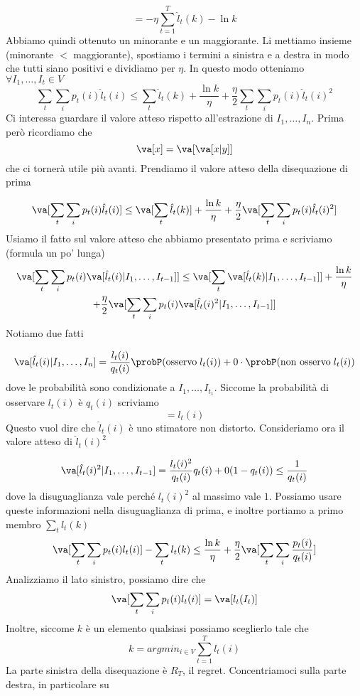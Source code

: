 \documentclass[12pt]{report}
\begin{document}
$$= - \eta \sum_{t = 1}^T \hat l_t(k) - \ln{k}$$
Abbiamo quindi ottenuto un minorante e un maggiorante. Li mettiamo insieme (minorante $<$ maggiorante), spostiamo i termini a sinistra e a destra in modo che tutti siano positivi e dividiamo per $\eta$. In questo modo otteniamo $\forall I_1,\dots,I_t \in V$
$$
\sum_t \sum_i p_t(i) \hat l_t(i) \leq \sum_t \hat l_t(k) + \frac{\ln{k}}{\eta} + \frac{\eta}{2} \sum_t \sum_i p_t(i) \hat l_t(i)^2
$$
Ci interessa  guardare il valore atteso rispetto all'estrazione di $I_1,\dots,I_n$. Prima però ricordiamo che 
$$\va[x] = \va[ \va[x|y]]$$
che ci tornerà utile più avanti. Prendiamo il valore atteso della disequazione di prima

$$
\va[\sum_t \sum_i p_t(i) \hat l_t(i)] \leq \va[\sum_t \hat l_t(k) ]+ \frac{\ln{k}}{\eta} + \frac{\eta}{2} \va[\sum_t \sum_i p_t(i) \hat l_t(i)^2]
$$
Usiamo il fatto sul valore atteso che abbiamo presentato prima e scriviamo (formula un po' lunga)
\begin{multline*}
\va[\sum_t \sum_i p_t(i) \va[\hat l_t(i) | I_1,\dots, I_{t-1}]] \leq  \va[\sum_t \va[\hat l_t(k) |I_1,\dots,I_{t-1} ]] + \frac{\ln{k}}{\eta} \\ + \frac{\eta}{2} \va[\sum_t \sum_i p_t(i) \va[\hat l_t(i)^2 | I_1,\dots,I_{t-1}]] 
\end{multline*}
Notiamo due fatti

$$
\va[\hat l_t(i) | I_1,\dots,I_n] = \frac{l_t(i)}{q_t(i)} \probP(\text{osservo} \; l_t(i))\\ +  0 \cdot \probP(\text{non osservo} \; l_t(i))
$$
dove le probabilità sono condizionate a $I_1,\dots, I_{t_1}$.  Siccome la probabilità di osservare $l_t(i)$ è $q_t(i)$ scriviamo
$$= l_t(i)$$
Questo vuol dire che $\hat l_t(i)$ è uno stimatore non distorto.
Consideriamo ora il valore atteso di $\hat l_t(i)^2$

$$\va[\hat l_t(i)^2 | I_1,\dots,I_{t-1}] = \frac{l_t(i)^2}{q_t(i)} q_t(i) + 0(1-q_t(i)) \leq \frac{1}{q_t(i)}$$
dove la disuguaglianza vale perché $l_t(i)^2$ al massimo vale $1$.
Possiamo usare queste informazioni nella disuguaglianza di prima, e inoltre portiamo a primo membro $\sum_t l_t(k)$
$$\va[\sum_t \sum_i p_t(i) l_t(i)] - \sum_t l_t(k) \leq \frac{\ln{k}}{\eta} + \frac{\eta}{2}\va[\sum_t \sum_i \frac{p_t(i)}{q_t(i)}]$$
Analizziamo il lato sinistro, possiamo dire che
$$\va[\sum_t \sum_i p_t(i) l_t(i)] = \va[l_t(I_t)]$$
Inoltre, siccome $k$ è un elemento qualsiasi possiamo sceglierlo tale che
$$k = argmin_{i \in V} \sum_{t=1}^T l_t(i)$$
La parte sinistra della disequazione è $R_T$, il regret. Concentriamoci sulla parte destra, in particolare su
\end{document}
